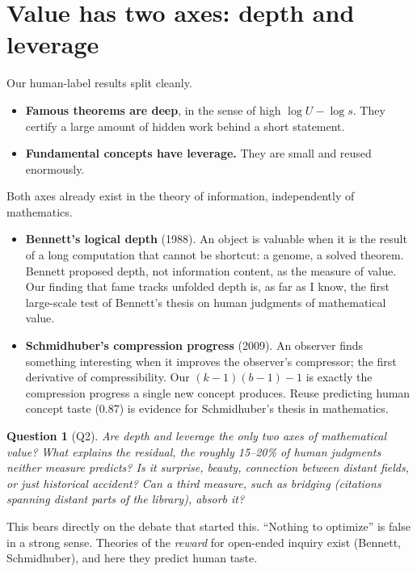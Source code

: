 \documentclass[11pt]{article}
\newtheorem*{question}{Question}
\begin{document}
\section{Value has two axes: depth and leverage}

Our human-label results split cleanly.
\begin{itemize}
\item \textbf{Famous theorems are deep}, in the sense of high $\log U - \log s$. They
  certify a large amount of hidden work behind a short statement.
\item \textbf{Fundamental concepts have leverage.} They are small and reused enormously.
\end{itemize}

Both axes already exist in the theory of information, independently of mathematics.
\begin{itemize}
\item \textbf{Bennett's logical depth} (1988). An object is valuable when it is the result
  of a long computation that cannot be shortcut: a genome, a solved theorem. Bennett
  proposed depth, not information content, as the measure of value. Our finding that fame
  tracks unfolded depth is, as far as I know, the first large-scale test of Bennett's
  thesis on human judgments of mathematical value.
\item \textbf{Schmidhuber's compression progress} (2009). An observer finds something
  interesting when it improves the observer's compressor; the first derivative of
  compressibility. Our $(k-1)(b-1)-1$ is exactly the compression progress a single new
  concept produces. Reuse predicting human concept taste (0.87) is evidence for
  Schmidhuber's thesis in mathematics.
\end{itemize}

\begin{question}[Q2]
Are depth and leverage the \emph{only} two axes of mathematical value? What explains the
residual, the roughly 15--20\% of human judgments neither measure predicts? Is it surprise,
beauty, connection between distant fields, or just historical accident? Can a third
measure, such as \emph{bridging} (citations spanning distant parts of the library), absorb
it?
\end{question}

\noindent This bears directly on the debate that started this. ``Nothing to optimize'' is
false in a strong sense. Theories of the \emph{reward} for open-ended inquiry exist
(Bennett, Schmidhuber), and here they predict human taste.
\end{document}
